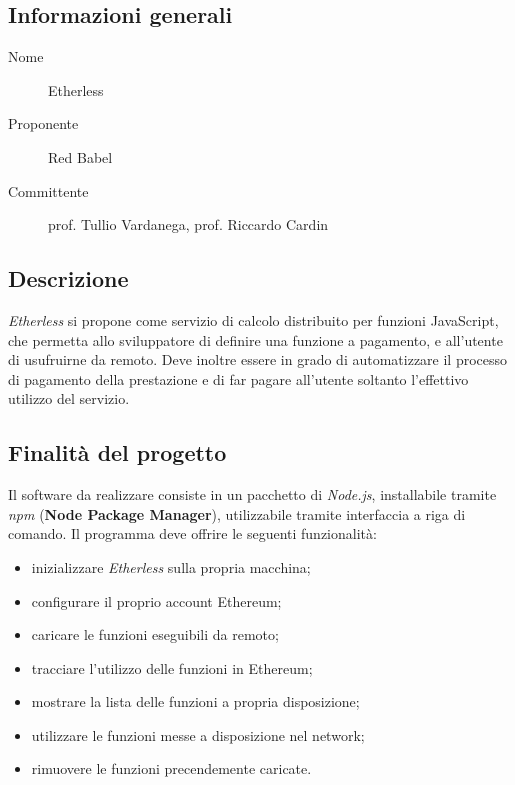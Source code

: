 \documentclass[../studio-di-fattibilita.tex]{subfiles}
\begin{document}
  \subsection{Informazioni generali}%
  \label{subsec:informazioni_generali}
  \begin{description}
    \item[Nome] Etherless
    \item[Proponente] Red Babel
    \item[Committente] prof. Tullio Vardanega, prof. Riccardo Cardin
  \end{description}
  \subsection{Descrizione}%
  \label{subsec:descrizione}
  \textit{Etherless} si propone come servizio di calcolo distribuito per funzioni JavaScript, che permetta allo sviluppatore di definire una funzione a pagamento, e all'utente di usufruirne da remoto. Deve inoltre essere in grado di automatizzare il processo di pagamento della prestazione e di far pagare all'utente soltanto l'effettivo utilizzo del servizio.
  \subsection{Finalità del progetto}%
  \label{subsec:finalita_del_progetto}
  Il software da realizzare consiste in un pacchetto di \textit{Node.js}, installabile tramite \textit{npm} (\textbf{Node Package Manager}), utilizzabile tramite interfaccia a riga di comando.
  Il programma deve offrire le seguenti funzionalità:
  \begin{itemize}
    \item inizializzare \textit{Etherless} sulla propria macchina;
    \item configurare il proprio account Ethereum;
    \item caricare le funzioni  eseguibili da remoto;
    \item tracciare l'utilizzo delle funzioni in Ethereum;
    \item mostrare la lista delle funzioni a propria disposizione;
    \item utilizzare le funzioni messe a disposizione nel network;
    \item rimuovere le funzioni precendemente caricate.
  \end{itemize}
\end{document}
